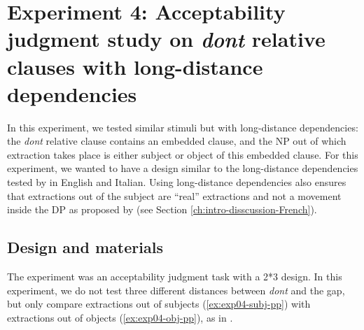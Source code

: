 \section[head=Experiment 4]{Experiment 4: Acceptability judgment study on \emph{dont} relative clauses with long-distance dependencies}

In this experiment, we tested similar stimuli but with long-distance dependencies: the \emph{dont} relative clause contains an embedded clause, and the NP out of which extraction takes place is either subject or object of this embedded clause. For this experiment, we wanted to have a design similar to the long-distance dependencies tested by \citet{Sprouse.2016} in English and Italian. Using long-distance dependencies also ensures that extractions out of the subject are ``real'' extractions and not a movement inside the DP as proposed by \citet{Heck.2009} (see Section \ref{ch:intro-disscussion-French}). 

\subsection{Design and materials}
The experiment was an acceptability judgment task with a 2*3 design. 
In this experiment, we do not test three different distances between \emph{dont} and the gap, but only compare extractions out of subjects (\ref{ex:exp04-subj-pp}) with extractions out of objects (\ref{ex:exp04-obj-pp}), as in \citet{Sprouse.2016}.

\eal 
{}
\label{ex:exp04-subj-pp}
\label{ex:exp04-obj-pp}
\zl 

